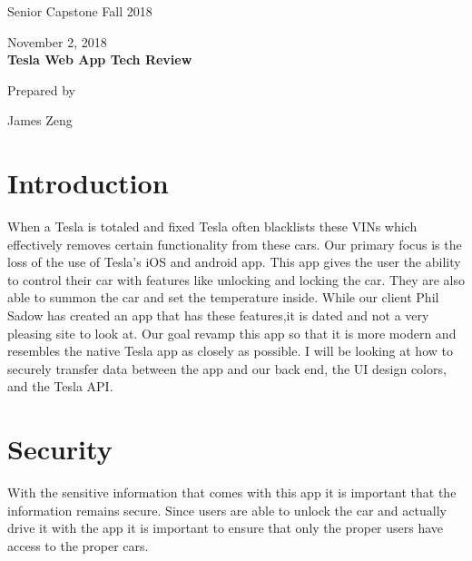 \documentclass[draftclsnofoot, onecolumn, compsoc, 10pt]{IEEEtran}
\def \TeamNumber{		James Zeng	}
\def \ProjectName{		Tesla Web App Tech Review }
\begin{document}
\begin{titlepage}
    \begin{singlespace}
        \hfill
        \par\vspace{.2in}
        \centering
        \scshape{
            \huge Senior Capstone Fall 2018\par
            November 2, 2018\\
            \vspace{1in}
            \textbf{\Huge\ProjectName}\par
            \vspace{1in}
            {\large Prepared by }\par
            \TeamNumber\par
            \vspace{5pt}
            \vspace{20pt}
        }

        \vfill
    \end{singlespace}
\end{titlepage}
\newpage
{}
\clearpage
\pagebreak
\section{Introduction}
When a Tesla is totaled and fixed Tesla often blacklists these VINs which effectively removes certain functionality from these cars. Our primary focus is the loss of the use of Tesla’s iOS and android app. This app gives the user the ability to control their car with features like unlocking and locking the car. They are also able to summon the car and set the temperature inside. While our client Phil Sadow has created an app that has these features,it is dated and not a very pleasing site to look at. Our goal revamp this app so that it is more modern and resembles the native Tesla app as closely as possible. I will be looking at how to securely transfer data between the app and our back end, the UI design colors, and the Tesla API.
\section{Security}
With the sensitive information that comes with this app it is important that the information remains secure. Since users are able to unlock the car and actually drive it with the app it is important to ensure that only the proper users have access to the proper cars.
\end{document}
